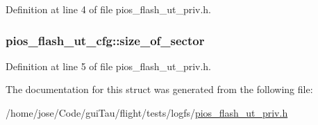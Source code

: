 Definition at line 4 of file pios\-\_\-flash\-\_\-ut\-\_\-priv.\-h.

\hypertarget{structpios__flash__ut__cfg_aa71a1f1da59549e862bcdbeae72174b8}{
\subsubsection[{size\-\_\-of\-\_\-sector}]{ pios\-\_\-flash\-\_\-ut\-\_\-cfg\-::size\-\_\-of\-\_\-sector}}\label{structpios__flash__ut__cfg_aa71a1f1da59549e862bcdbeae72174b8}


Definition at line 5 of file pios\-\_\-flash\-\_\-ut\-\_\-priv.\-h.



The documentation for this struct was generated from the following file\-:\begin{DoxyCompactItemize}
\item 
/home/jose/\-Code/gui\-Tau/flight/tests/logfs/\hyperlink{pios__flash__ut__priv_8h}{pios\-\_\-flash\-\_\-ut\-\_\-priv.\-h}\end{DoxyCompactItemize}
